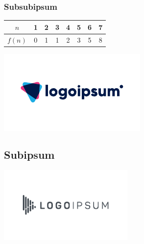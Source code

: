 \lipsum[2-4]

\subsubsection{Subsubipsum}

\begin{table}[h]
    \centering
    \begin{tabular}{c|ccccccc}
        $n$    & 1 & 2 & 3 & 4 & 5 & 6 & 7 \\ \hline
        $f(n)$ & 0 & 1 & 1 & 2 & 3 & 5 & 8 \\
    \end{tabular}
\end{table}

\lipsum[4]

\begin{center}
    \includegraphics[width=\textwidth]{lipsum_logo_1}
\end{center}

\lipsum[5]

\subsection{Subipsum}

\lipsum[1]

\begin{center}
    \includegraphics[width=0.5\textwidth]{lipsum_logo_2}
\end{center}

